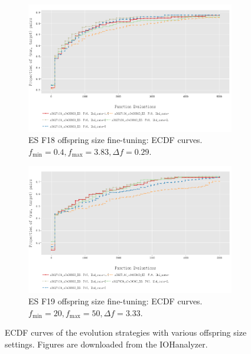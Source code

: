 \documentclass{article}
\begin{document}
\begin{figure}[!ht]
    \begin{subfigure}[h]{0.95\linewidth}
        \includegraphics[width=\linewidth]{es/f18/ECDF18lbd.png}
        \caption{ES F18 offspring size fine-tuning: ECDF curves. $f_{\min} = 0.4, f_{\max} = 3.83, \Delta f = 0.29$.}
    \end{subfigure}
    \hfill
    \begin{subfigure}[h]{0.95\linewidth}
        \includegraphics[width=\linewidth]{es/f19/ECDF19lbd.png}
        \caption{ES F19 offspring size fine-tuning: ECDF curves. $f_{\min} = 20, f_{\max} = 50, \Delta f = 3.33$.}
    \end{subfigure}
    \caption{ECDF curves of the evolution strategies with various offspring size settings. Figures are downloaded from the IOHanalyzer.}
    \label{fig:experi-es-osize-ecdf}
\end{figure}
\end{document}
